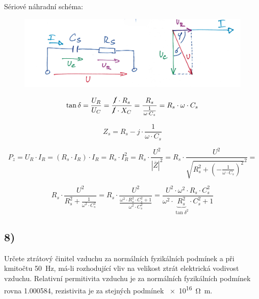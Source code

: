 
Sériové náhradní schéma:
\begin{figure}[h]
    \centering
    \includegraphics[width=.7\textwidth]{images/ul7_sch.jpg}
\end{figure}

\begin{equation*}
    \tan \delta = \frac{U_R}{U_C} = \frac{\cancel{I} \cdot R_s}{\cancel{I} \cdot X_C} = \frac{R_s}{\frac{1}{\omega \cdot C_s}} = R_s \cdot \omega \cdot C_s 
\end{equation*}

\begin{equation*}
    Z_s = R_s - j \cdot \frac{1}{\omega \cdot C_s}
\end{equation*}

\begin{equation*}
    P_z = U_R \cdot I_R = (R_s \cdot I_R) \cdot I_R = R_s \cdot I_R^2 = R_s \cdot \frac{U^2}{\left| \overline{Z} \right|^2} = R_s \cdot \frac{U^2}{\sqrt{R_s^2 + \left( - \frac{1}{\omega \cdot C_s} \right)^2}^2} = 
\end{equation*}

\begin{equation*}
    R_s \cdot \frac{U^2}{R_s^2 + \frac{1}{\omega^2 \cdot C_s^2}} = R_s \cdot \frac{U^2}{\frac{\omega^2 \cdot R_s^2 \cdot C_s^2 + 1}{\omega^2 \cdot C_s^2}} = \frac{U^2 \cdot \omega^2 \cdot R_s \cdot C_s^2}{\omega^2 \cdot \underbrace{R_s^2}_{\tan \delta^2} \cdot C_s^2 + 1}
\end{equation*}

\newpage


\subsection*{8)}
Určete ztrátový činitel vzduchu za normálních fyzikálních podmínek a při kmitočtu \SI{50}{\hertz}, má-li rozhodující vliv na velikost ztrát elektrická vodivost vzduchu. Relativní permitivita vzduchu je za normálních fyzikálních podmínek rovna \SI{1,000584}{}, rezistivita je za stejných podmínek \SI{e16}{\ohm\meter}.

